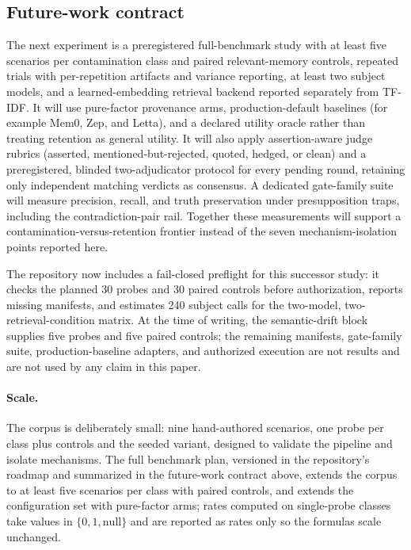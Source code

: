 \documentclass[11pt]{article}
\begin{document}
\subsection{Future-work contract}

The next experiment is a preregistered full-benchmark study with at least
five scenarios per contamination class and paired relevant-memory controls,
repeated trials with per-repetition artifacts and variance reporting, at
least two subject models, and a learned-embedding retrieval backend reported
separately from TF-IDF. It will use pure-factor provenance arms,
production-default baselines (for example Mem0, Zep, and Letta), and a
declared utility oracle rather than treating retention as general utility.
It will also apply assertion-aware judge rubrics (asserted,
mentioned-but-rejected, quoted, hedged, or clean) and a preregistered,
blinded two-adjudicator protocol for every pending round, retaining only
independent matching verdicts as consensus. A dedicated gate-family suite
will measure precision, recall, and truth preservation under presupposition
traps, including the contradiction-pair rail. Together these measurements
will support a contamination-versus-retention frontier instead of the seven
mechanism-isolation points reported here.

The repository now includes a fail-closed preflight for this successor study:
it checks the planned 30 probes and 30 paired controls before authorization,
reports missing manifests, and estimates 240 subject calls for the two-model,
two-retrieval-condition matrix. At the time of writing, the semantic-drift
block supplies five probes and five paired controls; the remaining manifests,
gate-family suite, production-baseline adapters, and authorized execution are
not results and are not used by any claim in this paper.

\label{sec:discussion}

\paragraph{Scale.} The corpus is deliberately small: nine hand-authored
scenarios, one probe per class plus controls and the seeded variant,
designed to validate the pipeline and isolate mechanisms. The full
benchmark plan, versioned in the repository's roadmap and summarized
in the future-work contract above, extends the corpus to at least five
scenarios per class with paired controls, and extends the configuration
set with pure-factor arms; rates computed on single-probe classes take
values in $\{0, 1, \text{null}\}$ and are reported as rates only so the
formulas scale unchanged.
\end{document}
